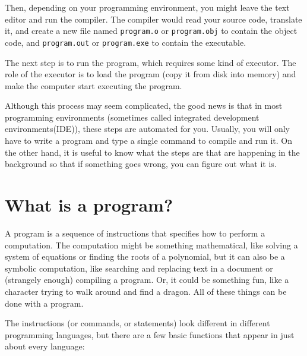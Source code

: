 Then, depending on your programming environment,
you might leave the text editor and run the compiler.  The compiler would read your source code, translate it, and create
a new file named {\tt program.o} or {\tt program.obj} to contain the object code,
and {\tt program.out} or {\tt program.exe} to contain the executable. 

\vspace{0.1in}
\centerline{}
\vspace{0.1in}

The next step is to run the program, which requires some kind
of executor.  The role of the executor is to load the program
(copy it from disk into memory) and make the computer start
executing the program.

Although this process may seem complicated, the good news is that in
most programming environments (sometimes called integrated development
environments(IDE)), these steps are automated for you.  Usually, you will only have to write a program and type a single command to compile and
run it.  On the other hand, it is useful to know what the steps are
that are happening in the background so that if something goes wrong,
you can figure out what it is.


\section{What is a program?}

A program is a sequence of instructions that specifies how to perform
a computation.  The computation might be something mathematical, like
solving a system of equations or finding the roots of a polynomial,
but it can also be a symbolic computation, like searching and
replacing text in a document or (strangely enough) compiling a
program. Or, it could be something fun, like a character trying to walk around and find a dragon. All of these things can be done with a program.


The instructions (or commands, or statements) look different in
different programming languages, but there are a few basic functions
that appear in just about every language:

